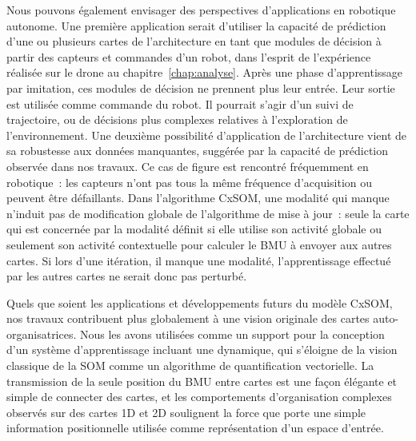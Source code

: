 Nous pouvons également envisager des perspectives d'applications en robotique autonome.
Une première application serait d'utiliser la capacité de prédiction d'une ou plusieurs cartes de l'architecture en tant que modules de décision à partir des capteurs et commandes d'un robot, dans l'esprit de l'expérience réalisée sur le drone au chapitre~\ref{chap:analyse}.
Après une phase d'apprentissage par imitation, ces modules de décision ne prennent plus leur entrée. Leur sortie est utilisée comme commande du robot. Il pourrait s'agir d'un suivi de trajectoire, ou de décisions plus complexes relatives à l'exploration de l'environnement.
Une deuxième possibilité d'application de l'architecture vient de sa robustesse aux données manquantes, suggérée par la capacité de prédiction observée dans nos travaux.
Ce cas de figure est rencontré fréquemment en robotique~: les capteurs n'ont pas tous la même fréquence d'acquisition ou peuvent être défaillants. 
Dans l'algorithme CxSOM, une modalité qui manque n'induit pas de modification globale de l'algorithme de mise à jour~: seule la carte qui est concernée par la modalité définit si elle utilise son activité globale ou seulement son activité contextuelle pour calculer le BMU à envoyer aux autres cartes.
Si lors d'une itération, il manque une modalité, l'apprentissage effectué par les autres cartes ne serait donc pas perturbé.


Quels que soient les applications et développements futurs du modèle CxSOM, nos travaux contribuent plus globalement à une vision originale des cartes auto-organisatrices. Nous les avons utilisées comme un support pour la conception d'un système d'apprentissage incluant une dynamique, qui s'éloigne de la vision classique de la SOM comme un algorithme de quantification vectorielle.
La transmission de la seule position du BMU entre cartes est une façon élégante et simple de connecter des cartes, et les comportements d'organisation complexes observés sur des cartes 1D et 2D soulignent la force que porte une simple information positionnelle utilisée comme représentation d'un espace d'entrée.



    



